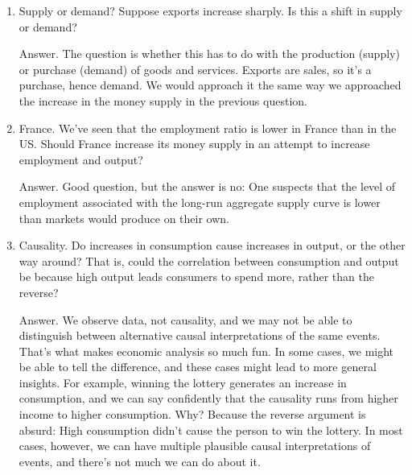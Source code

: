 \begin{enumerate}
\item Supply or demand?
Suppose exports increase sharply.
Is this a shift in supply or demand?

Answer.  The question is whether this has to do with the production (supply)
or purchase (demand) of goods and services.
Exports are sales, so it's a purchase, hence demand.
We would approach it the same way we approached the increase
in the money supply in the previous question.

%

\item France.
We've seen that the employment ratio is lower in France than in the US.
Should France increase its money supply in an attempt to increase
employment and output?

Answer.  Good question, but the answer is no:
One suspects that the level of employment
associated with the long-run aggregate supply
 curve is lower than
markets would produce on their own.

\item Causality.
Do increases in consumption cause increases in output,
or the other way around?
That is, could the correlation between consumption and output be because
high output leads consumers to spend more, rather than the reverse?

Answer.  We observe data, not causality,
and we may not be able to distinguish between
alternative causal interpretations of the same events.
That's what makes economic analysis so much fun.
In some cases, we might be able to tell the difference,
and these cases might lead to more general insights.
For example, winning the lottery generates an increase in consumption,
and we can say confidently that the causality runs from
higher income to higher consumption.
Why?  Because the reverse argument is absurd: High consumption didn't cause the person to win the lottery.
In most cases, however,
we can have multiple plausible causal interpretations of events,
and there's not much we can do about it.
\end{enumerate}


